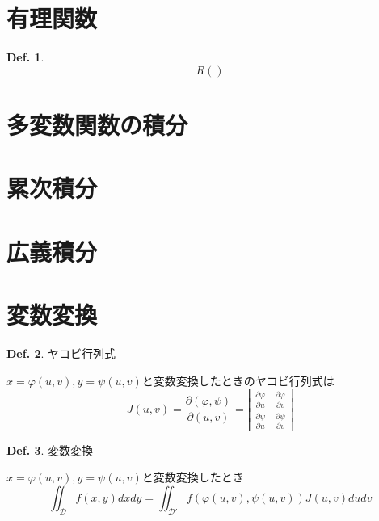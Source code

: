 \documentclass[a4paper,10pt,report]{amsart}
\theoremstyle{plain}
\theoremstyle{definition}
\newtheorem{defn}{Def.}[section]
\theoremstyle{remark}
\begin{document}
    \section{有理関数}
    \begin{leftbar}
        \begin{defn}
            \begin{equation}
                R()
            \end{equation}
        \end{defn}
    \end{leftbar}
    \section{多変数関数の積分}
    \section{累次積分}
    \section{広義積分}
    \section{変数変換}
    \begin{leftbar}
        \begin{defn}ヤコビ行列式\par
            \(x=\varphi(u,v),y=\psi(u,v)\)と変数変換したときのヤコビ行列式は
            \begin{equation}
                J(u,v)=\frac{\partial(\varphi,\psi)}{\partial(u,v)}=\left|
                \begin{array}{cc}
                    \frac{\partial\varphi}{\partial u} & \frac{\partial\varphi}{\partial v}\\
                    \frac{\partial\psi}{\partial u} & \frac{\partial\psi}{\partial v}
                \end{array}
                \right|
            \end{equation}
        \end{defn}
    \end{leftbar}
    \begin{leftbar}
        \begin{defn}変数変換\par
            \(x=\varphi(u,v),y=\psi(u,v)\)と変数変換したとき
            \begin{equation*}
                \iint_{\mathcal{D}}f(x,y)dxdy=\iint_{\mathcal{D}'}f(\varphi(u,v),\psi(u,v))J(u,v)dudv
            \end{equation*}
        \end{defn}
    \end{leftbar}
\end{document}
